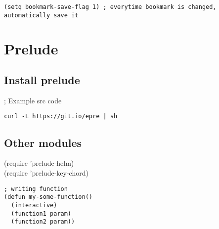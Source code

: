 \documentclass[11pt]{article}
\begin{document}
\begin{verbatim}
(setq bookmark-save-flag 1) ; everytime bookmark is changed, automatically save it
\end{verbatim}

\section{Prelude}
\label{sec:org69eb3ce}
\subsection{Install prelude}
\label{sec:orgf51933a}
; Example src code\\
\begin{verbatim}
curl -L https://git.io/epre | sh
\end{verbatim}
\subsection{Other modules}
\label{sec:orga37c2ff}
(require 'prelude-helm)\\
(require 'prelude-key-chord)\\

\begin{verbatim}
; writing function
(defun my-some-function()
  (interactive)
  (function1 param)
  (function2 param))
\end{verbatim}
\end{document}
